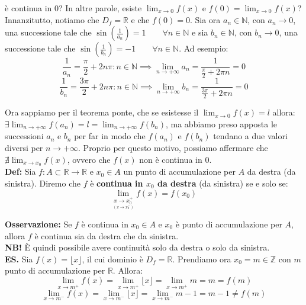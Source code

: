 \documentclass{article}
\begin{document}
\noindent è continua in $0$? In altre parole, esiste $\lim_{x \to 0} f(x)$ e $f(0) = \lim_{x \to 0} f(x)$?\\

\noindent Innanzitutto, notiamo che $D_f = \mathbb{R}$ e che $f(0) = 0$. Sia ora $a_n \in \mathbb{N}$, con $a_n \to 0$, una successione tale che $\sin(\frac{1}{a_n}) = 1 \qquad \forall n \in \mathbb{N}$ e sia $b_n \in \mathbb{N}$, con $b_n \to 0$, una successione tale che $\sin(\frac{1}{b_n}) = -1 \qquad \forall n \in \mathbb{N}$. Ad esempio:
\begin{equation*}
    \frac{1}{a_n} = \frac{\pi}{2} + 2n\pi : n \in \mathbb{N} \implies \lim_{n \to +\infty} a_n = \frac{1}{\frac{\pi}{2} + 2\pi n} = 0
\end{equation*}
\begin{equation*}
    \frac{1}{b_n} = \frac{3\pi}{2} + 2n\pi : n \in \mathbb{N} \implies \lim_{n \to +\infty} b_n = \frac{1}{\frac{3\pi}{2} + 2\pi n} = 0
\end{equation*}

\noindent Ora sappiamo per il teorema ponte, che se esistesse il $\lim_{x \to 0} f(x) = l$ allora: $\exists \lim_{n \to +\infty} f(a_n) = l = \lim_{n \to +\infty} f(b_n)$, ma abbiamo preso apposta le successioni $a_n$ e $b_n$ per far in modo che $f(a_n)$ e $f(b_n)$ tendano a due valori diversi per $n \to +\infty$. Proprio per questo motivo, possiamo affermare che $\nexists \lim_{x \to x_0} f(x)$, ovvero che $f(x)$ non è continua in $0$.\\

\noindent\textbf{Def:} Sia $f: A \subset \mathbb{R} \xrightarrow{} \mathbb{R}$ e $x_0 \in A$ un punto di accumulazione per $A$ da destra (da sinistra). Diremo che $f$ è \textbf{continua in $x_0$ da destra} (da sinistra) se e solo se:
\begin{equation*}
    \lim_{\underset{\scriptstyle (x \to x_0^-)}{x \to x_0^+}} f(x) = f(x_0)
\end{equation*}

\noindent\textbf{Osservazione:} Se $f$ è continua in $x_0 \in A$ e $x_0$ è punto di accumulazione per $A$, allora $f$ è continua sia da destra che da sinistra.\\

\noindent\textbf{NB!} È quindi possibile avere continuità solo da destra o solo da sinistra.\\

\noindent\textbf{ES.} Sia $f(x) = \lfloor x \rfloor$, il cui dominio è $D_f = \mathbb{R}$. Prendiamo ora $x_0 = m \in \mathbb{Z}$ con $m$ punto di accumulazione per $\mathbb{R}$. Allora:
\begin{equation*}
    \lim_{x \to m^+} f(x) = \lim_{x \to m^+} \lfloor x \rfloor = \lim_{x \to m^+} m = m = f(m)
\end{equation*}
\begin{equation*}
    \lim_{x \to m^-} f(x) = \lim_{x \to m^-} \lfloor x \rfloor = \lim_{x \to m^-} m - 1 = m - 1 \neq f(m)
\end{equation*}
\end{document}
